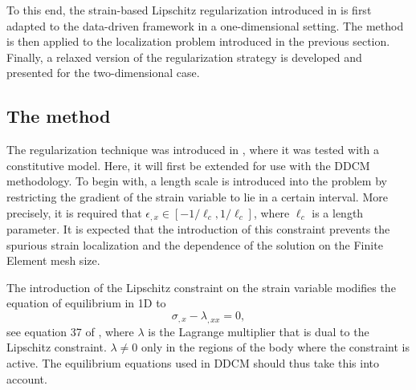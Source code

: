 \documentclass[10pt]{cas-sc}
\begin{document}
To this end, the strain-based Lipschitz regularization introduced in \cite{Kamasamudram2023} is first adapted to the data-driven framework in a one-dimensional setting. The method is then applied to the localization problem introduced in the previous section. Finally, a relaxed version of the regularization strategy is developed and presented for the two-dimensional case.


\subsection{The method\label{sec:length_scale}}
The regularization technique was introduced in \cite{Kamasamudram2023}, where it was tested with a constitutive model. Here, it will first be extended for use with the DDCM methodology. To begin with, a length scale is introduced into the problem by restricting the gradient of the strain variable to lie in a certain interval. More precisely, it is required that $\epsilon_{,x} \in [-1/{\ell_c}, 1/{\ell_c} ]$, where $\ell_c$ is a length parameter. It is expected that the introduction of this constraint prevents the spurious strain localization and the dependence of the solution on the Finite Element mesh size. 


The introduction of the Lipschitz constraint on the strain variable modifies the equation of equilibrium in 1D to 
\begin{equation}
	\sigma_{,x}- \lambda_{,xx}=0,\label{equil_couple_1D}
\end{equation}
see equation 37 of \cite{Kamasamudram2023}, where $\lambda$ is the Lagrange multiplier that is dual to the Lipschitz constraint. $\lambda \neq 0$ only in the regions of the body where the constraint is active. The equilibrium equations used in DDCM should thus take this into account. 
\end{document}

